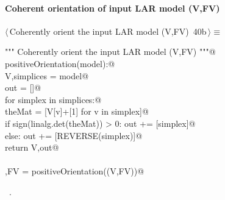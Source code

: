 \documentclass[11pt,oneside]{article}	%
\begin{document}
\paragraph{Coherent orientation of input LAR model (V,FV)}
\begin{flushleft} \small \label{scrap64}
\protect{}$\langle\,$Coherently orient the input LAR model (V,FV)\nobreak\ {\footnotesize 40b}$\,\rangle\equiv$
\vspace{-1ex}
\begin{list}{}{} \item
\mbox{}\verb@""" Coherently orient the input LAR model (V,FV) """@\\
\mbox{}\verb@def positiveOrientation(model):@\\
\mbox{}\verb@   V,simplices = model@\\
\mbox{}\verb@   out = []@\\
\mbox{}\verb@   for simplex in simplices:@\\
\mbox{}\verb@      theMat = [V[v]+[1] for v in simplex]@\\
\mbox{}\verb@      if sign(linalg.det(theMat)) > 0:  out += [simplex]@\\
\mbox{}\verb@      else: out += [REVERSE(simplex)]@\\
\mbox{}\verb@   return V,out@\\
\mbox{}\verb@@\\
\mbox{}\verb@V,FV = positiveOrientation((V,FV))@\\
\mbox{}\verb@@{\NWsep}
\end{list}
\vspace{-1ex}
\footnotesize\addtolength{\baselineskip}{-1ex}
\begin{list}{}{\setlength{\itemsep}{-\parsep}\setlength{\itemindent}{-\leftmargin}}
\item \NWtxtMacroRefIn\ .
\end{list}
\end{flushleft}
\end{document}
